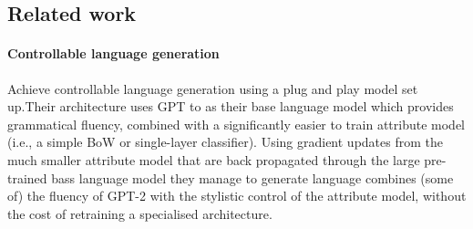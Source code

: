 
\subsection{Related work}

\paragraph{Controllable language generation}
\cite{dathathri2019plug} Achieve controllable language generation using a plug and play model set up.Their architecture uses GPT to as their base language model which provides grammatical fluency, combined with a significantly easier to train attribute model (i.e., a simple BoW or single-layer classifier). Using gradient updates from the much smaller attribute model that are back propagated through the large pre-trained bass language model they manage to generate language combines (some of) the fluency of GPT-2 with the stylistic control of the attribute model, without the cost of retraining a specialised architecture.

